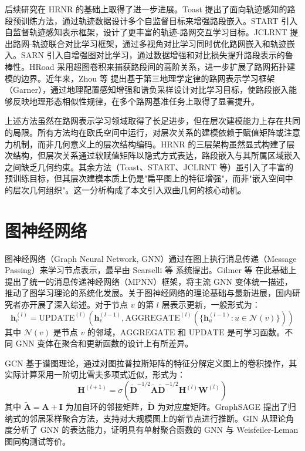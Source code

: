 后续研究在 HRNR 的基础上取得了进一步进展。Toast\cite{chen2021toast} 提出了面向轨迹感知的路段预训练方法，通过轨迹数据设计多个自监督目标来增强路段嵌入。START\cite{chen2022start} 引入自监督轨迹感知表示框架，设计了更丰富的轨迹-路网交互学习目标。JCLRNT\cite{mao2022jclrnt} 提出路网-轨迹联合对比学习框架，通过多视角对比学习同时优化路网嵌入和轨迹嵌入。SARN\cite{li2023sarn} 引入自增强图对比学习，通过数据增强和对比损失提升路段表示的鲁棒性。HRoad\cite{lin2023hroad} 采用超图卷积来捕获路段间的高阶关系，进一步扩展了路网拓扑建模的边界。近年来，Zhou 等\cite{zhou2024garner} 提出基于第三地理学定律的路网表示学习框架（Garner），通过地理配置感知增强和谱负采样设计对比学习目标，使路段嵌入能够反映地理形态相似性规律，在多个路网基准任务上取得了显著提升。

上述方法虽然在路网表示学习领域取得了长足进步，但在层次建模能力上存在共同的局限。所有方法均在欧氏空间中运行，对层次关系的建模依赖于赋值矩阵或注意力机制，而非几何意义上的层次结构编码。HRNR 的三层架构虽然显式构建了层次结构，但层次关系通过软赋值矩阵以隐式方式表达，路段嵌入与其所属区域嵌入之间缺乏几何约束。其余方法（Toast、START、JCLRNT 等）虽引入了丰富的预训练目标，但其层次建模本质上仍是"扁平图上的特征增强"，而非"嵌入空间中的层次几何组织"。这一分析构成了本文引入双曲几何的核心动机。

\section{图神经网络}

图神经网络（Graph Neural Network, GNN）通过在图上执行消息传递（Message Passing）来学习节点表示，最早由 Scarselli 等\cite{scarselli2009gnn} 系统提出。Gilmer 等\cite{gilmer2017mpnn} 在此基础上提出了统一的消息传递神经网络（MPNN）框架，将主流 GNN 变体统一描述，推动了图学习理论的系统化发展。关于图神经网络的理论基础与最新进展，国内研究者亦开展了深入综述\cite{ma2022gnn_survey_cn,xu2020gcn_survey_cn,zhao2022large_gnn_cn}。对于节点 $v$ 的第 $l$ 层表示更新，一般形式为：
\begin{equation}
    \mathbf{h}_v^{(l)} = \text{UPDATE}^{(l)}\left(\mathbf{h}_v^{(l-1)}, \text{AGGREGATE}^{(l)}\left(\{\mathbf{h}_u^{(l-1)} : u \in \mathcal{N}(v)\}\right)\right)
\end{equation}
其中 $\mathcal{N}(v)$ 是节点 $v$ 的邻域，$\text{AGGREGATE}$ 和 $\text{UPDATE}$ 是可学习函数。不同 GNN 变体在聚合和更新函数的设计上有所差异。

GCN\cite{Kipf2017} 基于谱图理论，通过对图拉普拉斯矩阵的特征分解定义图上的卷积操作，其实际计算采用一阶切比雪夫多项式近似，形式为：
\begin{equation}
    \mathbf{H}^{(l+1)} = \sigma\left(\tilde{\mathbf{D}}^{-1/2}\tilde{\mathbf{A}}\tilde{\mathbf{D}}^{-1/2}\mathbf{H}^{(l)}\mathbf{W}^{(l)}\right)
\end{equation}
其中 $\tilde{\mathbf{A}} = \mathbf{A} + \mathbf{I}$ 为加自环的邻接矩阵，$\tilde{\mathbf{D}}$ 为对应度矩阵。GraphSAGE\cite{Hamilton2017} 提出了归纳式的邻居采样聚合方法，支持对大规模图上的新节点进行推断。GIN\cite{Xu2019} 从理论角度分析了 GNN 的表达能力，证明具有单射聚合函数的 GNN 与 Weisfeiler-Leman 图同构测试等价。

